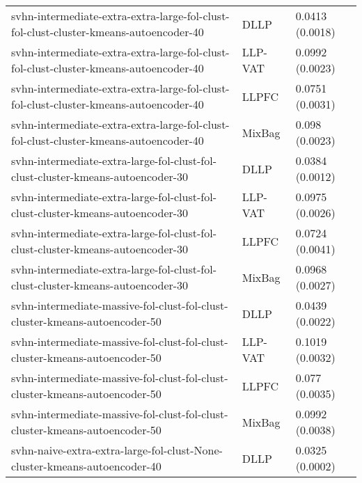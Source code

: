 \begin{longtable}{lll}
                        svhn-intermediate-extra-extra-large-fol-clust-fol-clust-cluster-kmeans-autoencoder-40 &      DLLP &                           0.0413 (0.0018) \\
                        svhn-intermediate-extra-extra-large-fol-clust-fol-clust-cluster-kmeans-autoencoder-40 &   LLP-VAT &                           0.0992 (0.0023) \\
                        svhn-intermediate-extra-extra-large-fol-clust-fol-clust-cluster-kmeans-autoencoder-40 &     LLPFC &                           0.0751 (0.0031) \\
                        svhn-intermediate-extra-extra-large-fol-clust-fol-clust-cluster-kmeans-autoencoder-40 &    MixBag &                            0.098 (0.0023) \\
                              svhn-intermediate-extra-large-fol-clust-fol-clust-cluster-kmeans-autoencoder-30 &      DLLP &                           0.0384 (0.0012) \\
                              svhn-intermediate-extra-large-fol-clust-fol-clust-cluster-kmeans-autoencoder-30 &   LLP-VAT &                           0.0975 (0.0026) \\
                              svhn-intermediate-extra-large-fol-clust-fol-clust-cluster-kmeans-autoencoder-30 &     LLPFC &                           0.0724 (0.0041) \\
                              svhn-intermediate-extra-large-fol-clust-fol-clust-cluster-kmeans-autoencoder-30 &    MixBag &                           0.0968 (0.0027) \\
                                  svhn-intermediate-massive-fol-clust-fol-clust-cluster-kmeans-autoencoder-50 &      DLLP &                           0.0439 (0.0022) \\
                                  svhn-intermediate-massive-fol-clust-fol-clust-cluster-kmeans-autoencoder-50 &   LLP-VAT &                           0.1019 (0.0032) \\
                                  svhn-intermediate-massive-fol-clust-fol-clust-cluster-kmeans-autoencoder-50 &     LLPFC &                            0.077 (0.0035) \\
                                  svhn-intermediate-massive-fol-clust-fol-clust-cluster-kmeans-autoencoder-50 &    MixBag &                           0.0992 (0.0038) \\
                                    svhn-naive-extra-extra-large-fol-clust-None-cluster-kmeans-autoencoder-40 &      DLLP &                           0.0325 (0.0002) \\

\end{longtable}
